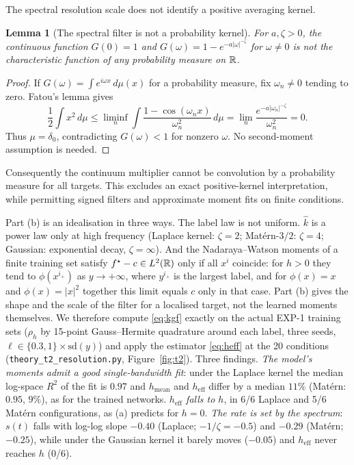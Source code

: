 \documentclass{article}
\theoremstyle{plain}
\newtheorem{lemma}{Lemma}
\theoremstyle{remark}
\begin{document}
The spectral resolution scale does not identify a positive averaging kernel.
\begin{lemma}[The spectral filter is not a probability kernel]
\label{lem:nonpositive-filter}
For $a,\zeta>0$, the continuous function $G(0)=1$ and
$G(\omega)=1-e^{-a|\omega|^{-\zeta}}$ for $\omega\ne0$ is not the characteristic
function of any probability measure on $\mathbb{R}$.
\end{lemma}
\begin{proof}
If $G(\omega)=\int e^{i\omega x}\,d\mu(x)$ for a probability measure, fix
$\omega_n\ne0$ tending to zero. Fatou's lemma gives
\[
\frac12\int x^2\,d\mu\le\liminf_n
\int\frac{1-\cos(\omega_nx)}{\omega_n^2}\,d\mu
=\lim_n\frac{e^{-a|\omega_n|^{-\zeta}}}{\omega_n^2}=0.
\]
Thus $\mu=\delta_0$, contradicting $G(\omega)<1$ for nonzero $\omega$.
No second-moment assumption is needed.
\end{proof}
Consequently the continuum multiplier cannot be convolution by a probability
measure for all targets. This excludes an exact positive-kernel interpretation,
while permitting signed filters and approximate moment fits on finite conditions.

Part (b) is an idealisation in three ways. The label law is not uniform. $\hat k$ is a
power law only at high frequency (Laplace kernel: $\zeta=2$; Mat\'ern-$3/2$: $\zeta=4$;
Gaussian: exponential decay, $\zeta=\infty$). And the Nadaraya--Watson moments of a finite
training set satisfy $f^\star-c\in L^2(\mathbb{R})$ only if all $x^i$ coincide: for $h>0$ they tend
to $\phi(x^{i_+})$ as $y\to+\infty$, where $y^{i_+}$ is the largest label, and for
$\phi(x)=x$ and $\phi(x)=|x|^2$ together this limit equals $c$ only in that case. Part (b) gives
the shape and the scale of the filter for a localised target, not the learned moments
themselves. We therefore compute \eqref{eq:kgf} exactly on the
actual EXP-1 training sets ($\rho_h$ by 15-point Gauss--Hermite quadrature around each
label, three seeds, $\ell\in\{0.3,1\}\times\mathrm{sd}(y)$) and apply the estimator
\eqref{eq:heff} at the 20 conditions (\texttt{theory\_t2\_resolution.py},
Figure~\ref{fig:t2}). Three findings. \emph{The model's moments admit a good single-bandwidth fit}: under the Laplace kernel the median log-space $R^2$ of the
fit is $0.97$ and $h_{\mathrm{mean}}$ and $h_{\mathrm{eff}}$ differ by a median $11\%$
(Mat\'ern: $0.95$, $9\%$), as for the trained networks. \emph{$h_{\mathrm{eff}}$ falls to
$h$}, in 6/6 Laplace and 5/6 Mat\'ern configurations, as (a) predicts for $h=0$.
\emph{The rate is set by the spectrum}: $s(t)$ falls with log-log slope $-0.40$
(Laplace; $-1/\zeta=-0.5$) and $-0.29$ (Mat\'ern; $-0.25$), while under the Gaussian
kernel it barely moves ($-0.05$) and $h_{\mathrm{eff}}$ never reaches $h$ (0/6).
\end{document}
